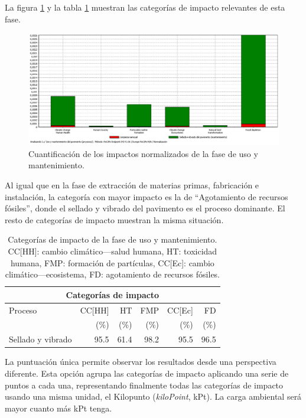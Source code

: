 La figura \ref{fig:uso_normalizacion} y la tabla \ref{categoriasimpactouso} muestran las categorías de impacto relevantes de esta fase.

\begin{figure}[!htb]
\centering
\includegraphics[width=15cm]{img/uso_normalizacion.png}
\caption{Cuantificación de los impactos normalizados de la fase de uso y mantenimiento.}
\label{fig:uso_normalizacion}
\end{figure}

Al igual que en la fase de extracción de materias primas, fabricación e instalación, la categoría con mayor impacto es la de ``Agotamiento de recursos fósiles'', donde el sellado y vibrado del pavimento es el proceso dominante. El resto de categorías de impacto muestran la misma situación.

\begin{table}[!htb]
\centering
\begin{tabular}{p{4cm}rrrrr}
\toprule
\multicolumn{6}{c}{Categorías de impacto}\\
\midrule
Proceso & CC[HH] & HT & FMP & CC[Ec] & FD\\
 &  (\%) & (\%) & (\%) & (\%) & (\%)\\
\midrule
Sellado y vibrado & 95.5 & 61.4 & 98.2 & 95.5 & 96.5\\
\bottomrule
\end{tabular}
\caption[Categorías de impacto de la fase de uso y mantenimiento.]{Categorías de impacto de la fase de uso y mantenimiento. CC[HH]: cambio climático—salud humana, HT: toxicidad humana, FMP: formación de partículas, CC[Ec]: cambio climático—ecosistema, FD: agotamiento de recursos fósiles.}
\label{categoriasimpactouso}
\end{table}

La puntuación única permite observar los resultados desde una perspectiva diferente. Esta opción agrupa las categorías de impacto aplicando una serie de puntos a cada una, representando finalmente todas las categorías de impacto usando una misma unidad, el Kilopunto (\textit{kiloPoint}, kPt). La carga ambiental será mayor cuanto más kPt tenga.

